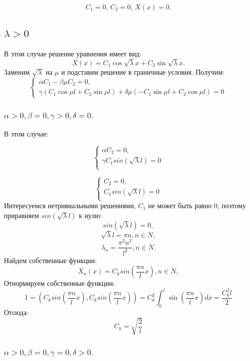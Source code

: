 \documentclass[12pt, a4paper]{report}
\begin{document}
\[ C_{1} = 0, \, C_{2} = 0, \, X(x) = 0. \]

\subsection{$\lambda > 0$}

В этом случае решение уравнения имеет вид:
\[ X(x) = C_{1} \cos \sqrt{\lambda} x + C_{2} \sin \sqrt{\lambda}x. \]
Заменим $\sqrt{\lambda}$ на $\mu$ и подставим решение в граничные условия. Получим:
\begin{displaymath}
	\begin{cases}
		\alpha C_{1} - \beta \mu C_{2} = 0, \\
		\gamma (C_{1} \cos \mu l + C_{2} \sin \mu l) + \delta \mu ( -C_{1} \sin \mu l + C_{2} \cos \mu l) = 0
	\end{cases}
\end{displaymath}

\subsubsection{ $ \alpha > 0, \beta = 0, \gamma > 0, \delta = 0. $}

В этом случае:

\begin{equation*}
 \begin{cases}
\alpha C_2=0, 
   \\
\gamma C_1 sin(\sqrt{\lambda}l )=0
   \\  
 \end{cases}
\end{equation*}

\begin{equation*}
 \begin{cases}
C_2=0, 
   \\
C_1 sin(\sqrt{\lambda}l )=0
   \\  
 \end{cases}
\end{equation*}
Интересуемся нетривиальными решениями, $C_1$ не может быть равно 0, поэтому приравняем $sin(\sqrt{\lambda}l) $ к нулю: 
\[sin(\sqrt{\lambda}l) =0,\]
\[\sqrt{\lambda}l = \pi n, n \in N,\]
\[\lambda_n = \frac{\pi^2 n^2}{l^2}, n \in N.\]
Найдем собственные функции:
\[X_n(x)=C_{k}sin(\frac{\pi n}{l}x),  n \in N,\]
Отнормируем собственные функции:
\[1=(C_{k}sin(\frac{\pi n}{l}x), C_{k}sin(\frac{\pi n}{l}x))=C_{k}^2 \int_{0}^{l} \sin(\frac{\pi n}{l}x)dx=\frac{C_{k}^2l}{2}\]
Отсюда:
\[C_{k}=\sqrt{\frac{2}{l}}\]

\subsubsection{ $ \alpha > 0, \beta = 0, \gamma = 0, \delta > 0. $}
\end{document}
